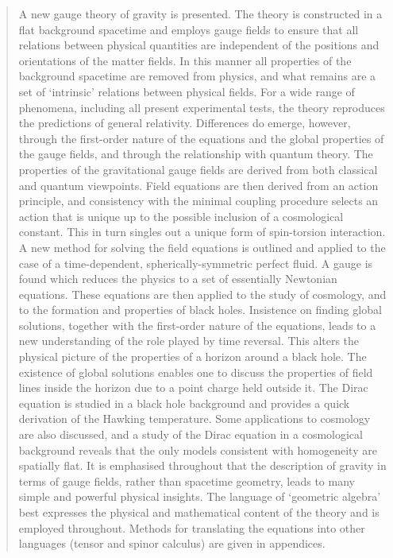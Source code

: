 \documentclass[a4paper]{article}
\numberwithin{equation}{section}
\begin{document}
\begin{abstract}
A new gauge theory of gravity is presented.  The theory is constructed
in a flat background spacetime and employs gauge fields to ensure that
all relations between physical quantities are independent of the
positions and orientations of the matter fields.  In this manner all
properties of the background spacetime are removed from physics, and
what remains are a set of `intrinsic' relations between physical
fields.  For a wide range of phenomena, including all present
experimental tests, the theory reproduces the predictions of general
relativity.  Differences do emerge, however, through the first-order
nature of the equations and the global properties of the gauge fields,
and through the relationship with quantum theory.  The properties of
the gravitational gauge fields are derived from both classical and
quantum viewpoints.  Field equations are then derived from an action
principle, and consistency with the minimal coupling procedure selects
an action that is unique up to the possible inclusion of a
cosmological constant.  This in turn singles out a unique form of
spin-torsion interaction.  A new method for solving the field
equations is outlined and applied to the case of a time-dependent,
spherically-symmetric perfect fluid.  A gauge is found which reduces
the physics to a set of essentially Newtonian equations.  These
equations are then applied to the study of cosmology, and to the
formation and properties of black holes.  Insistence on finding global
solutions, together with the first-order nature of the equations,
leads to a new understanding of the role played by time reversal.
This alters the physical picture of the properties of a horizon around
a black hole.  The existence of global solutions enables one to
discuss the properties of field lines inside the horizon due to a
point charge held outside it.  The Dirac equation is studied in a
black hole background and provides a quick derivation of the Hawking
temperature.  Some applications to cosmology are also discussed, and a
study of the Dirac equation in a cosmological background reveals that
the only models consistent with homogeneity are spatially flat.  It is
emphasised throughout that the description of gravity in terms of
gauge fields, rather than spacetime geometry, leads to many simple and
powerful physical insights.  The language of `geometric algebra' best
expresses the physical and mathematical content of the theory and is
employed throughout.  Methods for translating the equations into other
languages (tensor and spinor calculus) are given in appendices.

\end{abstract}
\end{document}

